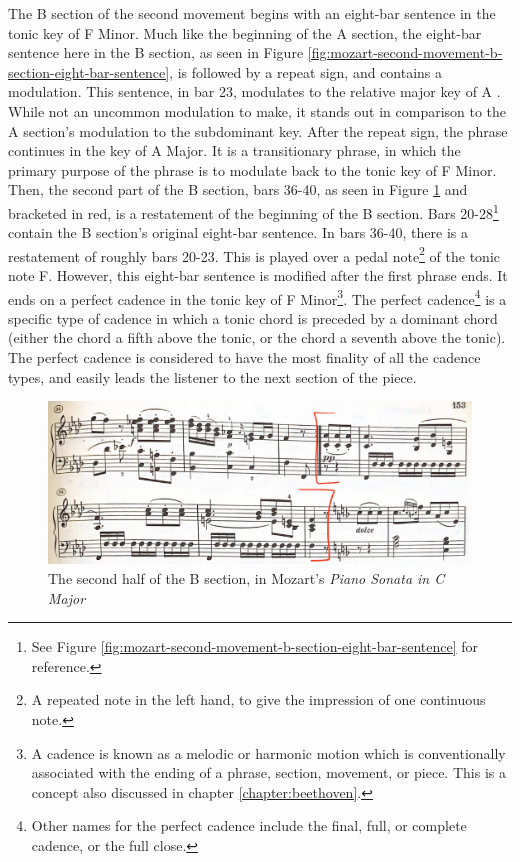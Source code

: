 The B section of the second movement begins with an eight-bar sentence in the tonic key of F Minor. Much like the beginning of the A section, the eight-bar sentence here in the B section, as seen in Figure \ref{fig:mozart-second-movement-b-section-eight-bar-sentence}\autocite{Henle_1977}, is followed by a repeat sign, and contains a modulation. This sentence, in bar 23, modulates to the relative major key of A \musFlat{}. While not an uncommon modulation to make, it stands out in comparison to the A section's modulation to the subdominant key. After the repeat sign, the phrase continues in the key of A\musFlat{} Major. It is a transitionary phrase, in which the primary purpose of the phrase is to modulate back to the tonic key of F Minor. Then, the second part of the B section, bars 36-40, as seen in Figure \ref{fig:mozart-second-movement-second-half-b-section}\autocite{Henle_1977} and bracketed in red, is a restatement of the beginning of the B section. Bars 20-28\footnote{See Figure \ref{fig:mozart-second-movement-b-section-eight-bar-sentence} for reference.} contain the B section's original eight-bar sentence. In bars 36-40, there is a restatement of roughly bars 20-23. This is played over a pedal note\footnote{A repeated note in the left hand, to give the impression of one continuous note.} of the tonic note F. However, this eight-bar sentence is modified after the first phrase ends. It ends on a perfect cadence\autocite{Nagley_Whittall_2011} in the tonic key of F Minor\footnote{A cadence is known as a melodic or harmonic motion which is conventionally associated with the ending of a phrase, section, movement, or piece. This is a concept also discussed in chapter \ref{chapter:beethoven}.}. The perfect cadence\footnote{Other names for the perfect cadence include the final, full, or complete cadence, or the full close.} is a specific type of cadence in which a tonic chord is preceded by a dominant chord (either the chord a fifth above the tonic, or the chord a seventh above the tonic). The perfect cadence is considered to have the most finality of all the cadence types, and easily leads the listener to the next section of the piece.

\begin{figure}
	\centering
	\includegraphics[width=\textwidth]{figures/mozart-second-movement-second-half-b-section.jpg}
	\caption{The second half of the B section, in Mozart's \textit{Piano Sonata in C Major}}
	\label{fig:mozart-second-movement-second-half-b-section}
\end{figure}

